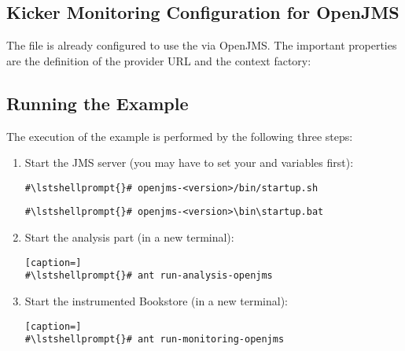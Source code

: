\subsection{Kicker Monitoring Configuration for OpenJMS}

The file  %
is already configured to use the  via OpenJMS. The important properties are %
the definition of the provider URL and the context factory:

\setPropertiesListing


\setPropertiesListing


\subsection{Running the Example}

 The execution of the example is performed by the following three steps:
\begin{enumerate}
\item Start the JMS server (you may have to set your  and  variables first):

\setBashListing
\begin{lstlisting}[caption=Start of the JMS server under UNIX-like systems]
#\lstshellprompt{}# openjms-<version>/bin/startup.sh
\end{lstlisting}
\begin{lstlisting}[caption=Start of the JMS server under Windows]
#\lstshellprompt{}# openjms-<version>\bin\startup.bat
\end{lstlisting}
\item Start the analysis part (in a new terminal):
\setBashListing
\begin{lstlisting}[caption=]
#\lstshellprompt{}# ant run-analysis-openjms
\end{lstlisting}
\item Start the instrumented Bookstore (in a new terminal):
\setBashListing
\begin{lstlisting}[caption=]
#\lstshellprompt{}# ant run-monitoring-openjms
\end{lstlisting}
\end{enumerate}
